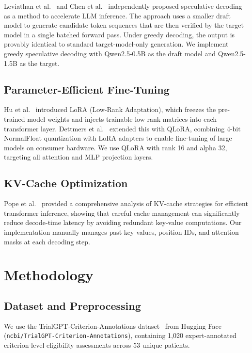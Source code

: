 \documentclass[conference]{IEEEtran}
\begin{document}
Leviathan et al.~\cite{leviathan2023fast} and Chen et al.~\cite{chen2023accelerating} independently proposed speculative decoding as a method to accelerate LLM inference. The approach uses a smaller draft model to generate candidate token sequences that are then verified by the target model in a single batched forward pass. Under greedy decoding, the output is provably identical to standard target-model-only generation. We implement greedy speculative decoding with Qwen2.5-0.5B as the draft model and Qwen2.5-1.5B as the target.

\subsection{Parameter-Efficient Fine-Tuning}

Hu et al.~\cite{hu2022lora} introduced LoRA (Low-Rank Adaptation), which freezes the pre-trained model weights and injects trainable low-rank matrices into each transformer layer. Dettmers et al.~\cite{dettmers2023qlora} extended this with QLoRA, combining 4-bit NormalFloat quantization with LoRA adapters to enable fine-tuning of large models on consumer hardware. We use QLoRA with rank 16 and alpha 32, targeting all attention and MLP projection layers.

\subsection{KV-Cache Optimization}

Pope et al.~\cite{pope2023efficiently} provided a comprehensive analysis of KV-cache strategies for efficient transformer inference, showing that careful cache management can significantly reduce decode-time latency by avoiding redundant key-value computations. Our implementation manually manages past-key-values, position IDs, and attention masks at each decoding step.

\section{Methodology}

\subsection{Dataset and Preprocessing}

We use the TrialGPT-Criterion-Annotations dataset~\cite{jin2024trialgpt} from Hugging Face (\texttt{ncbi/TrialGPT-Criterion-Annotations}), containing 1,020 expert-annotated criterion-level eligibility assessments across 53 unique patients.
\end{document}

